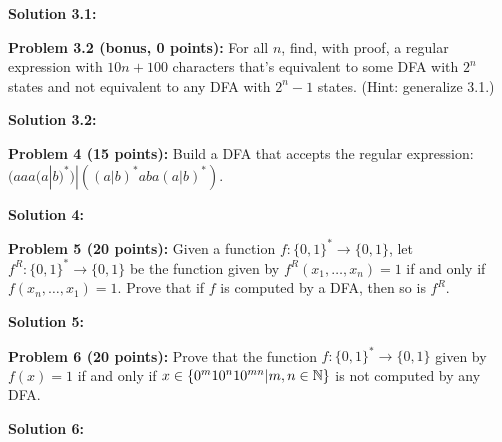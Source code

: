\documentclass[11pt]{article}
\begin{document}
\textbf{Solution 3.1:}%

\textbf{Problem 3.2 (bonus, 0 points):} For all $n$, find, with proof, a regular expression with $10n + 100$ characters that's equivalent to some DFA with $2^n$ states and not equivalent to any DFA with $2^n - 1$ states. (Hint: generalize 3.1.)

\textbf{Solution 3.2:}%


\textbf{Problem 4 (15 points):} Build a DFA that accepts the regular expression: $(aaa(a|b)^*)|\left((a|b)^*aba(a|b)^*\right)$.

\textbf{Solution 4:}%


\textbf{Problem 5 (20 points):} Given a function $f:\{0,1\}^* \to \{0,1\}$, let $f^R:\{0,1\}^* \to \{0,1\}$ be the function given by $f^R(x_1,\ldots,x_n) = 1$ if and only if $f(x_n,\ldots,x_1) = 1$.
Prove that if $f$ is computed by a DFA, then so is $f^R$. 


\textbf{Solution 5:}%

\textbf{Problem 6 (20 points):} Prove that the function $f:\{0,1\}^* \to \{0,1\}$ given by $f(x) = 1$ if and only if $x \in \{0^m 1 0^n 1 0^{mn} | m,n \in \mathbb{N}\}$ is not computed by any DFA.

\textbf{Solution 6:}%
\end{document}
